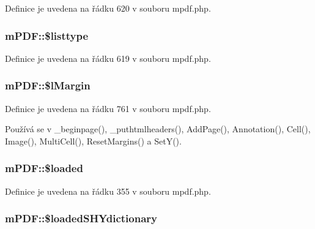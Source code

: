 Definice je uvedena na řádku 620 v souboru mpdf.\-php.

\hypertarget{classm_p_d_f_a5c58e0dac0a2072b9bf5f79ed879f3d7}{
\subsubsection[{\$listtype}]{\setlength{\rightskip}{0pt plus 5cm}m\-P\-D\-F\-::\$listtype}}\label{classm_p_d_f_a5c58e0dac0a2072b9bf5f79ed879f3d7}


Definice je uvedena na řádku 619 v souboru mpdf.\-php.

\hypertarget{classm_p_d_f_abb7c52a1c7a22d62c248048f75ad719f}{
\subsubsection[{\$l\-Margin}]{\setlength{\rightskip}{0pt plus 5cm}m\-P\-D\-F\-::\$l\-Margin}}\label{classm_p_d_f_abb7c52a1c7a22d62c248048f75ad719f}


Definice je uvedena na řádku 761 v souboru mpdf.\-php.



Používá se v \-\_\-beginpage(), \-\_\-puthtmlheaders(), Add\-Page(), Annotation(), Cell(), Image(), Multi\-Cell(), Reset\-Margins() a Set\-Y().

\hypertarget{classm_p_d_f_a2ed77ddd9975c60a758c5704d33a38d7}{
\subsubsection[{\$loaded}]{\setlength{\rightskip}{0pt plus 5cm}m\-P\-D\-F\-::\$loaded}}\label{classm_p_d_f_a2ed77ddd9975c60a758c5704d33a38d7}


Definice je uvedena na řádku 355 v souboru mpdf.\-php.

\hypertarget{classm_p_d_f_a43b11646b7a933262fc70cc69e3f4e6f}{
\subsubsection[{\$loaded\-S\-H\-Ydictionary}]{\setlength{\rightskip}{0pt plus 5cm}m\-P\-D\-F\-::\$loaded\-S\-H\-Ydictionary}}\label{classm_p_d_f_a43b11646b7a933262fc70cc69e3f4e6f}


